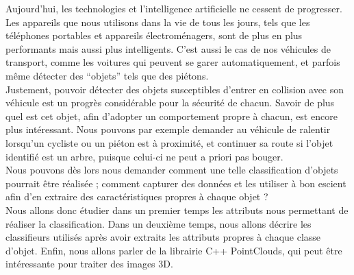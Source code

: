 Aujourd'hui, les technologies et l'intelligence artificielle ne cessent de progresser. Les appareils que nous utilisons dans la vie de tous les jours, tels que les téléphones portables et appareils électroménagers, sont de plus en plus performants mais aussi plus intelligents. C'est aussi le cas de nos véhicules de transport, comme les voitures qui peuvent se garer automatiquement, et parfois même détecter des \enquote{objets} tels que des piétons.\\

Justement, pouvoir détecter des objets susceptibles d'entrer en collision avec son véhicule est un progrès considérable pour la sécurité de chacun. Savoir de plus quel est cet objet, afin d'adopter un comportement propre à chacun, est encore plus intéressant. Nous pouvons par exemple demander au véhicule de ralentir lorsqu'un cycliste ou un piéton est à proximité, et continuer sa route si l'objet identifié est un arbre, puisque celui-ci ne peut a priori pas bouger.\\

Nous pouvons dès lors nous demander comment une telle classification d'objets pourrait être réalisée ; comment capturer des données et les utiliser à bon escient afin d'en extraire des caractéristiques propres à chaque objet ?\\

Nous allons donc étudier dans un premier temps les attributs nous permettant de réaliser la classification. Dans un deuxième temps, nous allons décrire les classifieurs utilisés après avoir extraits les attributs propres à chaque classe d'objet. Enfin, nous allons parler de la librairie C++ PointClouds, qui peut être intéressante pour traiter des images 3D.\\